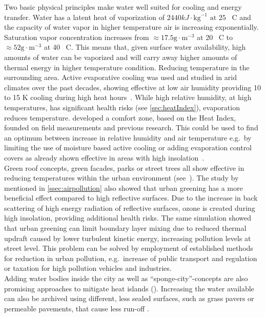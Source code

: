 \documentclass[12pt,a4paper, english,twoside]{scrartcl}
\begin{document}
      Two basic physical principles make water well suited for cooling and energy transfer.
      Water has a latent heat of vaporization of $2440 kJ\cdot \text{kg}^{-1} \text{ at } 25$ \textdegree\ C and the capacity of water vapor in higher temperature air is increasing exponentially.
      Saturation vapor concentration increases from $\approx17.5 \text{g}\cdot \text{m}^{-3}$ at 20 \textdegree\ C  to $\approx 52 \text{g}\cdot \text{m}^{-3}$ at 40 \textdegree\ C.
      This means that, given surface water availability, high amounts of water can be vaporized and will carry away higher amounts of thermal energy in higher temperature condition.
      Reducing temperature in the surrounding area. 
      Active evaporative cooling was used and studied in arid climates over the past decades, showing effective at low air humidity providing 10 to 15 K cooling during high heat hours~\autocite{Vanos2022}.
      While high relative humidity, at high temperatures, has significant health risks (see \cref{sec:heatIndex}), evaporation reduces temperature.
      \Cite{Pontes2022} developed a comfort zone, based on the Heat Index, founded on field measurements and previous research. 
      This could be used to find an optimum between increase in relative humidity and air temperature e.g.\ by limiting the use of moisture based active cooling or adding evaporation control covers as already shown effective in areas with high insolation~\cite{Ghazvinian2021}.\\
      Green roof concepts, green facades, parks or street trees all show effective in reducing temperatures within the urban environment (see~\cite{Ramamurthy2014, Feyisa2014, Dimoudi2003, Gartland2008}).
      The study by~\cite{Fallmann2016} mentioned in \cref{ssec:airpollution} also showed that urban greening has a more beneficial effect compared to high reflective surfaces. 
      Due to the increase in back scattering of high energy radiation of reflective surfaces, ozone is created during high insolation, providing additional health risks.
      The same simulation showed that urban greening can limit boundary layer mixing due to reduced thermal updraft caused by lower turbulent kinetic energy, increasing pollution levels at street level.
      This problem can be solved by employment of established methods for reduction in urban pollution, e.g.\ increase of public transport and regulation or taxation for high pollution vehicles and industries. \\
      Adding water bodies inside the city as well as ``sponge-city''-concepts are also promising approaches to mitigate heat islands (\cite{He2019}).
      Increasing the water available can also be archived using different, less sealed surfaces, such as grass pavers or permeable pavements, that cause less run-off \autocite[p. 7]{EPA2008}.
\end{document}
